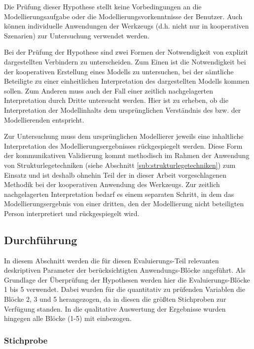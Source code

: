 Die Prüfung dieser Hypothese stellt keine Vorbedingungen an die Modellierungsaufgabe oder die Modellierungsvorkenntnisse der Benutzer. Auch können individuelle Anwendungen der Werkzeugs (d.h. nicht nur in kooperativen Szenarien) zur Untersuchung verwendet werden. 

Bei der Prüfung der Hypothese sind zwei Formen der Notwendigkeit von explizit dargestellten Verbindern zu unterscheiden. Zum Einen ist die Notwendigkeit bei der kooperativen Erstellung eines Modells zu untersuchen, bei der sämtliche Beteiligte zu einer einheitlichen Interpretation des dargestellten Modells kommen sollen. Zum Anderen muss auch der Fall einer zeitlich nachgelagerten Interpretation durch Dritte untersucht werden. Hier ist zu erheben, ob die Interpretation der Modellinhalts dem ursprünglichen Verständnis des bzw. der Modellierenden entspricht.

Zur Untersuchung muss dem ursprünglichen Modellierer jeweils eine inhaltliche Interpretation des Modellierungsergebnisses rückgespiegelt werden. Diese Form der kommunikativen Validierung kommt methodisch im Rahmen der Anwendung von Strukturlegetechniken (siehe Abschnitt \ref{sub:strukturlegetechniken}) zum Einsatz und ist deshalb ohnehin Teil der in dieser Arbeit vorgeschlagenen Methodik bei der kooperativen Anwendung des Werkzeugs. Zur zeitlich nachgelagerten Interpretation bedarf es einem separaten Schritt, in dem das Modellierungsergebnis von einer dritten, den der Modellierung nicht beteiligten Person interpretiert und rückgespiegelt wird. 


\subsection{Durchführung} %
\label{sub:m_durchführung}

In diesem Abschnitt werden die für diesen Evaluierungs-Teil relevanten deskriptiven Parameter der berücksichtigten Anwendungs-Blöcke angeführt.
Als Grundlage der Überprüfung der Hypothesen werden hier die Evaluierungs-Blöcke 1 bis 5 verwendet. Dabei wurden für die quantitativ zu prüfenden Variablen die Blöcke 2, 3 und 5 herangezogen, da in diesen die größten Stichproben zur Verfügung standen. In die qualitative Auswertung der Ergebnisse wurden hingegen alle Blöcke (1-5) mit einbezogen.

\subsubsection{Stichprobe} %
\label{ssub:stichprobe}

